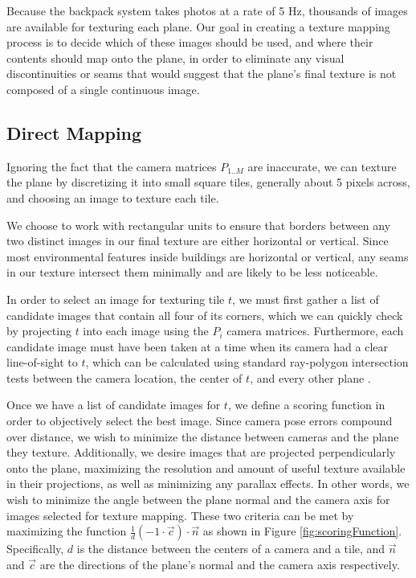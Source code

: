 \documentclass[10pt,twocolumn,letterpaper]{article}
\begin{document}
Because the backpack system takes photos at a rate of 5 Hz, thousands
of images are available for texturing each plane. Our goal in creating
a texture mapping process is to decide which of these images should be
used, and where their contents should map onto the plane, in order to
eliminate any visual discontinuities or seams that would suggest that
the plane's final texture is not composed of a single continuous image.

\subsection{Direct Mapping}
\label{sec:directMapping}

Ignoring the fact that the camera matrices $P_{1..M}$ are inaccurate, we can texture the plane by discretizing it into small square tiles, generally about 5 pixels across, and choosing an image to texture each tile.

We choose to work with rectangular units to ensure that borders
between any two distinct images in our final texture are either
horizontal or vertical. Since most environmental features inside
buildings are horizontal or vertical, any seams in our texture
intersect them minimally and are likely to be less noticeable.

In order to select an image for texturing tile $t$, we must first
gather a list of candidate images that contain all four of its
corners, which we can quickly check by projecting $t$ into each image
using the $P_i$ camera matrices. Furthermore, each candidate image
must have been taken at a time when its camera had a clear
line-of-sight to $t$, which can be calculated using standard
ray-polygon intersection tests between the camera location, the center
of $t$, and every other plane \cite{rayintersection}.

Once we have a list of candidate images for $t$, we define a scoring
function in order to objectively select the best image. Since camera
pose errors compound over distance, we wish to minimize the distance
between cameras and the plane they texture. Additionally, we desire
images that are projected perpendicularly onto the plane, maximizing
the resolution and amount of useful texture available in their
projections, as well as minimizing any parallax effects. In other words, we wish to minimize the angle between the
plane normal and the camera axis for images selected for texture
mapping. These two criteria can be met by maximizing the function
$\frac{1}{d} (-1 \cdot \vec{c}) \cdot \vec{n}$ as shown in Figure
\ref{fig:scoringFunction}. Specifically, $d$ is the distance between
the centers of a camera and a tile, and $\vec{n}$ and $\vec{c}$ are
the directions of the plane's normal and the camera axis respectively.
\end{document}
